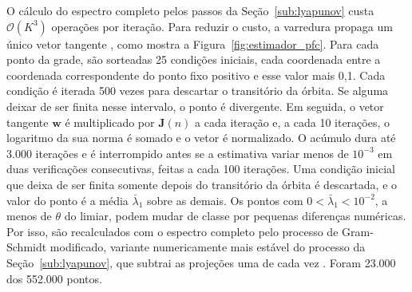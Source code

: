 \documentclass{pfccefsa}
\begin{document}
O cálculo do espectro completo pelos passos da
Seção~\ref{sub:lyapunov} custa $\mathcal{O}(K^3)$ operações por iteração. Para
reduzir o custo, a varredura propaga um único vetor tangente
\cite{Benettin1980a,Wolf1985}, como mostra a Figura~\ref{fig:estimador_pfc}.
Para cada ponto da grade, são sorteadas 25 condições iniciais, cada coordenada
entre a coordenada correspondente do ponto fixo positivo e esse valor mais 0,1. Cada condição é iterada 500
vezes para descartar o transitório da órbita. Se alguma deixar de ser finita
nesse intervalo, o ponto é divergente. Em seguida, o vetor tangente $\mathbf{w}$
é multiplicado por $\mathbf{J}(n)$ a cada iteração e, a cada 10 iterações, o
logaritmo da sua norma é somado e o vetor é normalizado. O acúmulo dura até
3.000 iterações e é interrompido antes se a estimativa variar menos de
$10^{-3}$ em duas verificações consecutivas, feitas a cada 100 iterações. Uma
condição inicial que deixa de ser finita somente depois do transitório da
órbita é descartada, e o valor do ponto é a média $\bar\lambda_1$ sobre as
demais. Os pontos com $0<\bar\lambda_1<10^{-2}$, a menos de $\theta$ do limiar, podem
mudar de classe por pequenas diferenças numéricas. Por isso, são recalculados com
o espectro completo pelo processo de Gram-Schmidt modificado, variante
numericamente mais estável do processo da Seção~\ref{sub:lyapunov}, que subtrai
as projeções uma de cada vez \cite{Trefethen1997}. Foram 23.000 dos 552.000
pontos.
\end{document}
